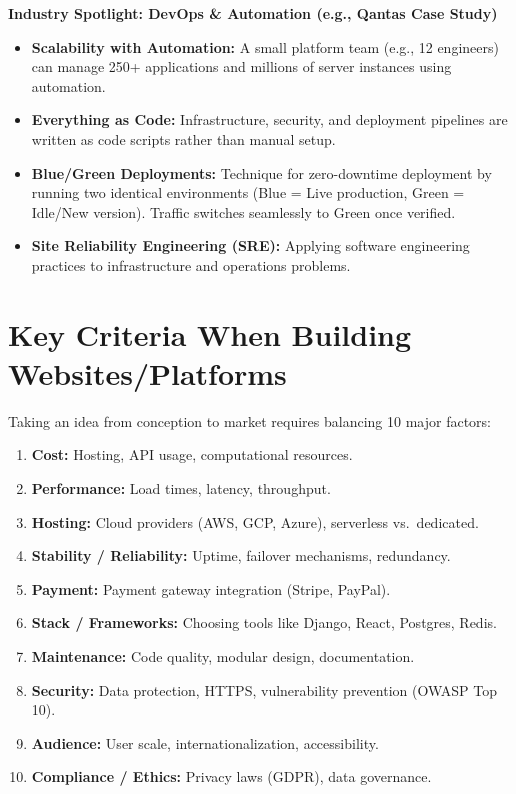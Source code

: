 \documentclass[8pt, a4paper]{article}
\begin{document}
\begin{conceptbox}
\textbf{Industry Spotlight: DevOps \& Automation (e.g., Qantas Case Study)}
\begin{itemize}
  \item \textbf{Scalability with Automation:} A small platform team (e.g., 12 engineers) can manage 250+ applications and millions of server instances using automation.
  \item \textbf{Everything as Code:} Infrastructure, security, and deployment pipelines are written as code scripts rather than manual setup.
  \item \textbf{Blue/Green Deployments:} Technique for zero-downtime deployment by running two identical environments (Blue = Live production, Green = Idle/New version). Traffic switches seamlessly to Green once verified.
  \item \textbf{Site Reliability Engineering (SRE):} Applying software engineering practices to infrastructure and operations problems.
\end{itemize}
\end{conceptbox}

\section{Key Criteria When Building Websites/Platforms}

Taking an idea from conception to market requires balancing 10 major factors:

\begin{enumerate}
  \item \textbf{Cost:} Hosting, API usage, computational resources.
  \item \textbf{Performance:} Load times, latency, throughput.
  \item \textbf{Hosting:} Cloud providers (AWS, GCP, Azure), serverless vs.\ dedicated.
  \item \textbf{Stability / Reliability:} Uptime, failover mechanisms, redundancy.
  \item \textbf{Payment:} Payment gateway integration (Stripe, PayPal).
  \item \textbf{Stack / Frameworks:} Choosing tools like Django, React, Postgres, Redis.
  \item \textbf{Maintenance:} Code quality, modular design, documentation.
  \item \textbf{Security:} Data protection, HTTPS, vulnerability prevention (OWASP Top 10).
  \item \textbf{Audience:} User scale, internationalization, accessibility.
  \item \textbf{Compliance / Ethics:} Privacy laws (GDPR), data governance.
\end{enumerate}
\end{document}
